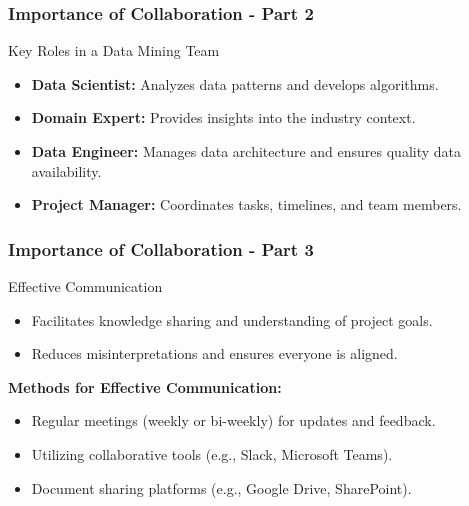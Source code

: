 \documentclass[aspectratio=169]{beamer}
\begin{document}
\begin{frame}[fragile]
    \frametitle{Importance of Collaboration - Part 2}
    \begin{block}{Key Roles in a Data Mining Team}
        \begin{itemize}
            \item \textbf{Data Scientist:} Analyzes data patterns and develops algorithms.
            \item \textbf{Domain Expert:} Provides insights into the industry context.
            \item \textbf{Data Engineer:} Manages data architecture and ensures quality data availability.
            \item \textbf{Project Manager:} Coordinates tasks, timelines, and team members.
        \end{itemize}
    \end{block}
\end{frame}

\begin{frame}[fragile]
    \frametitle{Importance of Collaboration - Part 3}
    \begin{block}{Effective Communication}
        \begin{itemize}
            \item Facilitates knowledge sharing and understanding of project goals.
            \item Reduces misinterpretations and ensures everyone is aligned.
        \end{itemize}
        \textbf{Methods for Effective Communication:}
        \begin{itemize}
            \item Regular meetings (weekly or bi-weekly) for updates and feedback.
            \item Utilizing collaborative tools (e.g., Slack, Microsoft Teams).
            \item Document sharing platforms (e.g., Google Drive, SharePoint).
        \end{itemize}
    \end{block}
\end{frame}
\end{document}

